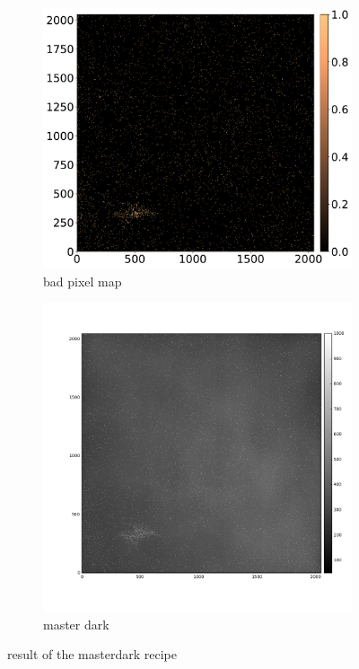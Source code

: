 \documentclass[twoside,single]{lion-msc}
\begin{document}
\begin{figure}[hb]
\centering
\begin{subfigure}{.5\textwidth}
  \centering
  \includegraphics[width=1\linewidth]{badpixelmap}
  \caption{bad pixel map}
\end{subfigure}%
\begin{subfigure}{.5\textwidth}
  \centering
  \includegraphics[width=1\linewidth]{masterdark}
  \caption{master dark}
\end{subfigure}
\caption{result of the masterdark recipe}
\label{fig:masterdark}
\end{figure}
\end{document}
